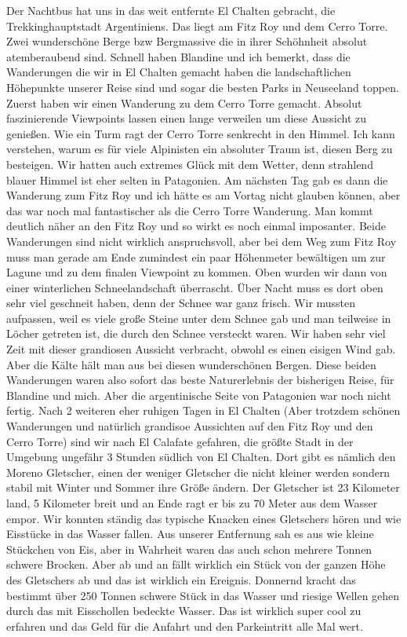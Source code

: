 \documentclass[11pt]{book}
\begin{document}
Der Nachtbus hat uns in das weit entfernte El Chalten gebracht, die Trekkinghauptstadt Argentiniens. Das liegt am Fitz Roy und 
dem Cerro Torre. Zwei wunderschöne Berge bzw Bergmassive die in ihrer Schöhnheit absolut atemberaubend sind. Schnell haben Blandine 
und ich bemerkt, dass die Wanderungen die wir in El Chalten gemacht haben die landschaftlichen Höhepunkte unserer Reise sind 
und sogar die besten Parks in Neuseeland toppen. Zuerst haben wir einen Wanderung zu dem Cerro Torre gemacht. Absolut faszinierende 
Viewpoints lassen einen lange verweilen um diese Aussicht zu genießen. Wie ein Turm ragt der Cerro Torre senkrecht in den Himmel. 
Ich kann verstehen, warum es für viele Alpinisten ein absoluter Traum ist, diesen Berg zu besteigen. Wir hatten auch extremes 
Glück mit dem Wetter, denn strahlend blauer Himmel ist eher selten in Patagonien. Am nächsten Tag gab es dann die Wanderung zum 
Fitz Roy und ich hätte es am Vortag nicht glauben können, aber das war noch mal fantastischer als die Cerro Torre Wanderung. 
Man kommt deutlich näher an den Fitz Roy und so wirkt es noch einmal imposanter. Beide Wanderungen sind nicht wirklich anspruchsvoll, 
aber bei dem Weg zum Fitz Roy muss man gerade am Ende zumindest ein paar Höhenmeter bewältigen um zur Lagune und zu dem finalen 
Viewpoint zu kommen. Oben wurden wir dann von einer winterlichen Schneelandschaft überrascht. Über Nacht muss es dort oben sehr 
viel geschneit haben, denn der Schnee war ganz frisch. Wir mussten aufpassen, weil es viele große Steine unter dem Schnee gab 
und man teilweise in Löcher getreten ist, die durch den Schnee versteckt waren. Wir haben sehr viel Zeit mit dieser grandiosen 
Aussicht verbracht, obwohl es einen eisigen Wind gab. Aber die Kälte hält man aus bei diesen wunderschönen Bergen. Diese beiden 
Wanderungen waren also sofort das beste Naturerlebnis der bisherigen Reise, für Blandine und mich. Aber die argentinische Seite 
von Patagonien war noch nicht fertig. Nach 2 weiteren eher ruhigen Tagen in El Chalten (Aber trotzdem schönen Wanderungen und 
natürlich grandisoe Aussichten auf den Fitz Roy und den Cerro Torre) sind wir nach El Calafate gefahren, die größte Stadt in der 
Umgebung ungefähr 3 Stunden südlich von El Chalten. 
Dort gibt es nämlich den Moreno Gletscher, einen der weniger Gletscher die nicht kleiner werden sondern stabil mit Winter und Sommer 
ihre Größe ändern. Der Gletscher ist 23 Kilometer land, 5 Kilometer breit und an Ende ragt er bis zu 70 Meter aus dem Wasser empor. 
Wir konnten ständig das typische Knacken eines Gletschers hören und wie Eisstücke in das Wasser fallen. Aus unserer Entfernung sah es aus 
wie kleine Stückchen von Eis, aber in Wahrheit waren das auch schon mehrere Tonnen schwere Brocken. Aber ab und an fällt wirklich 
ein Stück von der ganzen Höhe des Gletschers ab und das ist wirklich ein Ereignis. Donnernd kracht das bestimmt über 250 Tonnen 
schwere Stück in das Wasser und riesige Wellen gehen durch das mit Eisschollen bedeckte Wasser. Das ist wirklich super cool zu erfahren 
und das Geld für die Anfahrt und den Parkeintritt alle Mal wert. 
\end{document}
